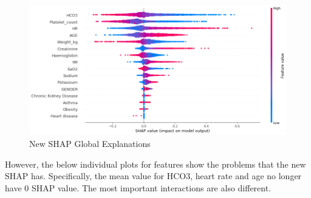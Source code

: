 \documentclass[12pt]{article}
\begin{document}
\begin{figure}[H]
\centering\caption{New SHAP Global Explanations}
\includegraphics[scale=0.5]{New SHAP Global.png}
\end{figure}

However, the below individual plots for features show the problems that the new SHAP has. Specifically, the mean value for HCO3, heart rate and age no longer have 0 SHAP value. The most important interactions are also different.
\end{document}
